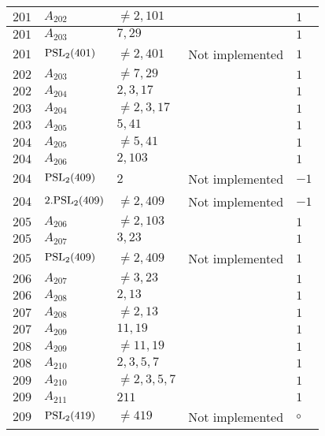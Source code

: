 \documentclass[a4paper, 11pt]{article}
\begin{document}
\begin{longtable}{lllll}
        $ 201 $ & $ A_{202} $ & $ \neq 2, 101 $ & $ ~ $ & $ 1  $ \\ \hline
        $ 201 $ & $ A_{203} $ & $ 7, 29 $ & $ ~ $ & $ 1  $ \\ \hline
        $ 201 $ & $ {\rm PSL}_{2}(401) $ & $ \neq 2, 401 $ & Not implemented & $ 1  $ \\ \hline
        $ 202 $ & $ A_{203} $ & $ \neq 7, 29 $ & $ ~ $ & $ 1  $ \\ \hline
        $ 202 $ & $ A_{204} $ & $ 2, 3, 17 $ & $ ~ $ & $ 1  $ \\ \hline
        $ 203 $ & $ A_{204} $ & $ \neq 2, 3, 17 $ & $ ~ $ & $ 1  $ \\ \hline
        $ 203 $ & $ A_{205} $ & $ 5, 41 $ & $ ~ $ & $ 1  $ \\ \hline
        $ 204 $ & $ A_{205} $ & $ \neq 5, 41 $ & $ ~ $ & $ 1  $ \\ \hline
        $ 204 $ & $ A_{206} $ & $ 2, 103 $ & $ ~ $ & $ 1  $ \\ \hline
        $ 204 $ & $ {\rm PSL}_{2}(409) $ & $ 2 $ & Not implemented & $ -1  $ \\ \hline
        $ 204 $ & $ 2.{\rm PSL}_{2}(409) $ & $ \neq 2, 409 $ & Not implemented & $ -1  $ \\ \hline
        $ 205 $ & $ A_{206} $ & $ \neq 2, 103 $ & $ ~ $ & $ 1  $ \\ \hline
        $ 205 $ & $ A_{207} $ & $ 3, 23 $ & $ ~ $ & $ 1  $ \\ \hline
        $ 205 $ & $ {\rm PSL}_{2}(409) $ & $ \neq 2, 409 $ & Not implemented & $ 1  $ \\ \hline
        $ 206 $ & $ A_{207} $ & $ \neq 3, 23 $ & $ ~ $ & $ 1  $ \\ \hline
        $ 206 $ & $ A_{208} $ & $ 2, 13 $ & $ ~ $ & $ 1  $ \\ \hline
        $ 207 $ & $ A_{208} $ & $ \neq 2, 13 $ & $ ~ $ & $ 1  $ \\ \hline
        $ 207 $ & $ A_{209} $ & $ 11, 19 $ & $ ~ $ & $ 1  $ \\ \hline
        $ 208 $ & $ A_{209} $ & $ \neq 11, 19 $ & $ ~ $ & $ 1  $ \\ \hline
        $ 208 $ & $ A_{210} $ & $ 2, 3, 5, 7 $ & $ ~ $ & $ 1  $ \\ \hline
        $ 209 $ & $ A_{210} $ & $ \neq 2, 3, 5, 7 $ & $ ~ $ & $ 1  $ \\ \hline
        $ 209 $ & $ A_{211} $ & $ 211 $ & $ ~ $ & $ 1  $ \\ \hline
        $ 209 $ & $ {\rm PSL}_{2}(419) $ & $ \neq 419 $ & Not implemented & $\circ$ \\ \hline

\end{longtable}
\end{document}
